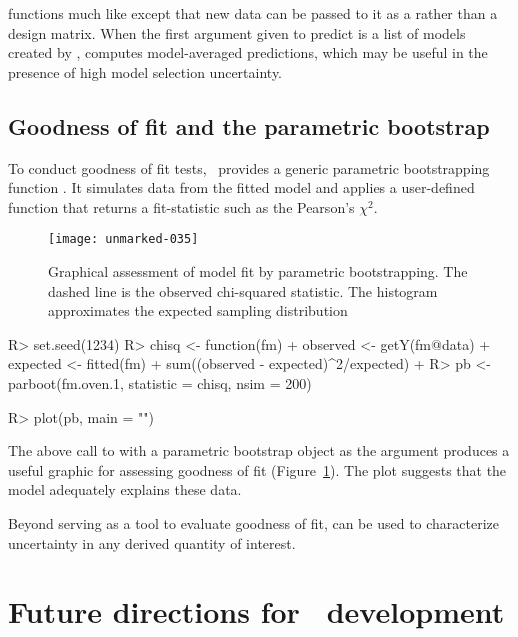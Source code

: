 \documentclass[article,shortnames]{jss}
\newcommand{\um}{\pkg{unmarked}}
\begin{document}
{ functions much like  except that new data can be
passed to it as a  rather than a design matrix. When the first
argument given to predict is a list of models created by ,
 computes model-averaged predictions, which may be
useful in the presence of high model selection uncertainty.



\subsection{Goodness of fit and the parametric bootstrap}

To conduct goodness of fit tests, \um\ provides a generic parametric
bootstrapping function .  It simulates data from the fitted model and
applies a user-defined function that returns a fit-statistic such as the
Pearson's $\chi^2$.



\begin{figure}[th!]
  \centering
\texttt{[image: unmarked-035]}
\caption{Graphical assessment of model fit by parametric bootstrapping.  The dashed
line is the observed chi-squared statistic. The histogram approximates the
expected sampling distribution}
\label{fig:pb}
\end{figure}

\begin{Schunk}
\begin{Sinput}
R> set.seed(1234)
R> chisq <- function(fm) {
+     observed <- getY(fm@data)
+     expected <- fitted(fm)
+     sum((observed - expected)^2/expected)
+ }
R> pb <- parboot(fm.oven.1, statistic = chisq, nsim = 200)
\end{Sinput}
\end{Schunk}
\begin{Schunk}
\begin{Sinput}
R> plot(pb, main = "")
\end{Sinput}
\end{Schunk}


The above call to  with a parametric bootstrap object as
the argument produces a useful graphic for assessing goodness of fit
(Figure~\ref{fig:pb}).  The plot suggests that the model adequately
explains these data.

Beyond serving as a tool to evaluate goodness of fit,
 can be used to characterize uncertainty in any derived quantity
of interest.


\section[Future directions for unmarked development]{Future directions for \um\ development}
\label{sec:future-direct-unmark}

}
\end{document}
